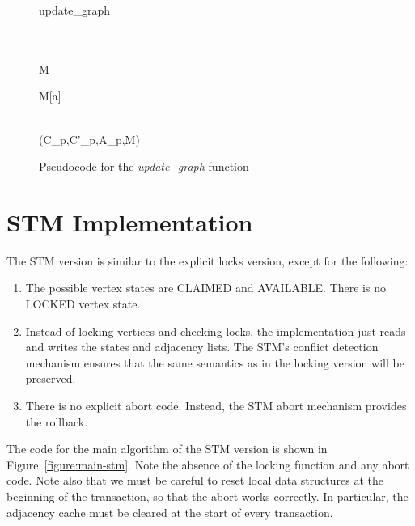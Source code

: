 \documentclass[10pt]{article}
\begin{document}
\begin{sloppypar}
\begin{center}
\begin{figure}
\begin{algorithm}{update\_graph}{}
 \\
 \\
 \\ 
\begin{FOR}{}
M \leftarrow \emptyset \\
\begin{FOR}{}
M[a] \leftarrow {}
\end{FOR} \\
 (C_p,C'_p,A_p,M)
\end{FOR}
\end{algorithm}
\caption{Pseudocode for the \emph{update\_graph} function}
\label{figure:update}
\end{figure}
\end{center}

\section{STM Implementation}

The STM version is similar to the explicit locks version, except for the following:
\begin{enumerate}
\item The possible vertex states are CLAIMED and AVAILABLE.  There is
no LOCKED vertex state.
\item Instead of locking vertices and checking locks, the
implementation just reads and writes the states and adjacency lists.
The STM's conflict detection mechanism ensures that the same semantics
as in the locking version will be preserved.
\item There is no explicit abort code.  Instead, the STM abort
  mechanism provides the rollback.
\end{enumerate}

The code for the main algorithm of the STM version is shown in
Figure~\ref{figure:main-stm}.  Note the absence of the locking
function and any abort code.  Note also that we must be careful to
reset local data structures at the beginning of the transaction, so
that the abort works correctly.  In particular, the adjacency cache
must be cleared at the start of every transaction.


\end{sloppypar}
\end{document}
